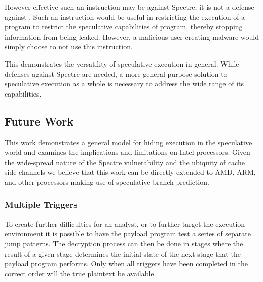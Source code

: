 However effective such an instruction may be against Spectre, it is not a
defense against \speculake. Such an instruction would be useful in restricting
the execution of a program to restrict the speculative capabilities of program,
thereby stopping information from being leaked. However, a malicious user
creating \speculake malware would simply choose to not use this instruction.

This demonstrates the versatility of speculative execution in general. While
defenses against Spectre are needed, a more general purpose solution to
speculative execution as a whole is necessary to address the wide range of its
capabilities.


\subsection{Future Work}
\label{subsec:future-work}

This work demonstrates a general model for hiding execution in 
the speculative world and examines the implications and limitations on 
Intel processors. Given the wide-spread nature of the Spectre vulnerability 
and the ubiquity of cache side-channels we believe that this work can 
be directly extended to AMD, ARM, and other processors making use of
speculative branch prediction.

\subsubsection{Multiple Triggers}
To create further difficulties for an analyst, or to further target
the execution environment it is possible
to have the payload program test a series of separate jump patterns. The decryption
process can then be done in stages where the result of a given stage determines 
the initial state of the next stage that the payload program 
performs. Only when all triggers have been completed in the correct order will
the true plaintext be available. 

